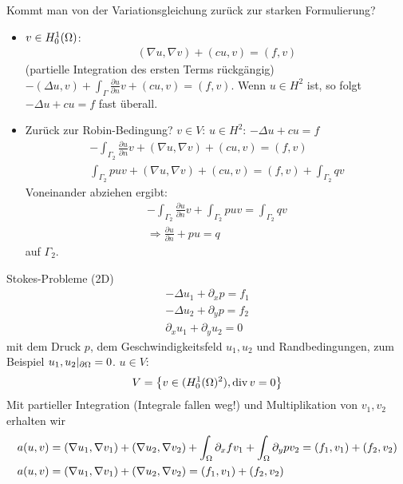 Kommt man von der Variationsgleichung zurück zur starken Formulierung?
\begin{itemize}
\item $v \in H_0^1(\Omega)$: 
  \begin{align*}
    (\nabla u, \nabla v)+ (c u, v) = (f, v)
  \end{align*}
  (partielle Integration des ersten Terms rückgängig) $-(\Delta u, v)+ \int_\Gamma \frac{\partial u}{\partial n}v+ (c u , v) = (f, v)$. Wenn $u \in H^2$ ist, so folgt $-\Delta u + c u = f$ fast überall.
\item Zurück zur Robin-Bedingung? $v \in V$: $u \in H^2$: $-\Delta u + cu= f$
  \begin{align*}
    -\int_{\Gamma_2} \frac{\partial u}{\partial n} v + (\nabla u, \nabla v) + (cu, v) =(f, v)\\
\int_{\Gamma_2} puv + (\nabla u, \nabla v) + (cu, v) = (f, v)+ \int_{\Gamma_2}q v
  \end{align*}
Voneinander abziehen ergibt:
\begin{align*}
  -\int_{\Gamma_2}\frac{\partial u}{\partial n} v+ \int_{\Gamma_2}p u v = \int_{\Gamma_2} q v \\
\Rightarrow \frac{\partial u}{\partial n} + pu = q
\end{align*}
auf $\Gamma_2$.
\end{itemize}
\begin{beispiel} Stokes-Probleme (2D)
  \begin{align*}
    - \Delta u_1 + \partial_x p = f_1 \\
    - \Delta u_2 + \partial_y p = f_2 \\
    \partial_x u_1 + \partial_y u_2 = 0
  \end{align*}
mit dem Druck $p$, dem Geschwindigkeitsfeld $u_1, u_2$ und Randbedingungen, zum Beispiel $u_1, u_2 |_{\partial \Omega} = 0$. $u \in V$:
\begin{align*}
  V = \left\{ v \in (H_0^1(\Omega)^2), \operatorname{div} v = 0 \right\}
\end{align*}
Mit partieller Integration (Integrale fallen weg!) und Multiplikation von $v_1, v_2$ erhalten wir
\begin{align*}
&  a(u, v)= (\nabla u_1, \nabla v_1) + (\nabla u_2, \nabla v_2) + \int_\Omega \partial_x f v_1 + \int_\Omega \partial_y p v_2 = (f_1, v_1)+ (f_2, v_2)\\
&  a(u, v)= (\nabla u_1, \nabla v_1) + (\nabla u_2, \nabla v_2) = (f_1, v_1)+ (f_2, v_2)
\end{align*}
\end{beispiel}
  
